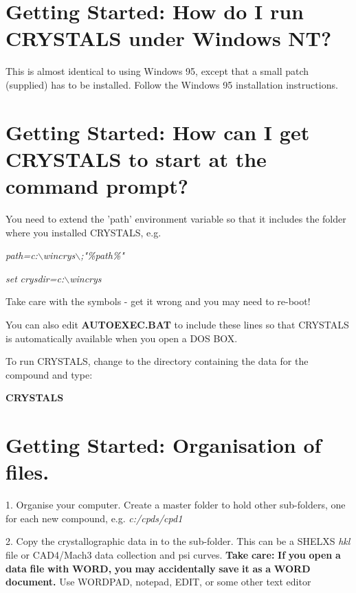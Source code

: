 \documentclass[10pt,a4paper]{report}
\begin{document}
\section{Getting Started: How do I run CRYSTALS under Windows NT?}


This is almost identical to using Windows 95, except
that a small patch (supplied) has to be installed. Follow the
Windows 95 installation instructions.

\section{Getting Started: How can I get CRYSTALS to start at the command prompt?}


You need to extend the 'path' environment variable so that it
includes the folder where you installed CRYSTALS, e.g.


 \emph{path=c:$\backslash$wincrys$\backslash$;"\%path\%"}


 \emph{set} \emph{crysdir=c:$\backslash$wincrys}



 Take care with the symbols - get it wrong and you may need to re-boot!



 You can also edit {\bf AUTOEXEC.BAT} to include these lines so that CRYSTALS is
automatically available when you open a DOS BOX.


 To run CRYSTALS, change to the directory containing the data for
the compound and type:


{\bf CRYSTALS}


\section{Getting Started: Organisation of files.}



1. Organise your computer. Create a master folder to
hold other sub-folders, one for each new compound, e.g.
\emph{c:/cpds/cpd1}



2. Copy the crystallographic data in to the sub-folder.
This can be a SHELXS \emph{hkl} file or CAD4/Mach3 data collection
and psi curves. {\bf Take} {\bf care:} {\bf If} {\bf you} {\bf open} {\bf a} {\bf data} {\bf file} {\bf with} {\bf WORD,}
{\bf you} {\bf may} {\bf accidentally} {\bf save} {\bf it} {\bf as} {\bf a} {\bf WORD} {\bf document.} Use WORDPAD, notepad, EDIT,
or some other text editor
\end{document}
